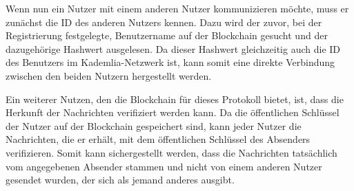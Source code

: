 Wenn nun ein Nutzer mit einem anderen Nutzer kommunizieren möchte, muss er zunächst die ID des anderen Nutzers kennen. Dazu wird der zuvor, bei der Registrierung festgelegte, Benutzername auf der Blockchain gesucht und der dazugehörige Hashwert ausgelesen. Da dieser Hashwert gleichzeitig auch die ID des Benutzers im Kademlia-Netzwerk ist, kann somit eine direkte Verbindung zwischen den beiden Nutzern hergestellt werden.

Ein weiterer Nutzen, den die Blockchain für dieses Protokoll bietet, ist, dass die Herkunft der Nachrichten verifiziert werden kann. Da die öffentlichen Schlüssel der Nutzer auf der Blockchain gespeichert sind, kann jeder Nutzer die Nachrichten, die er erhält, mit dem öffentlichen Schlüssel des Absenders verifizieren. Somit kann sichergestellt werden, dass die Nachrichten tatsächlich vom angegebenen Absender stammen und nicht von einem anderen Nutzer gesendet wurden, der sich als jemand anderes ausgibt.

